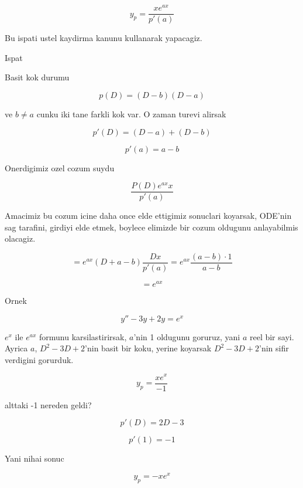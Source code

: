 \documentclass[12pt,fleqn]{article}\usepackage{../common}
\begin{document}
\[ y_p = \frac{x e^{ax}}{p'(a)} \]

Bu ispati ustel kaydirma kanunu kullanarak yapacagiz. 

Ispat

Basit kok durumu

\[ p(D) = (D-b)(D-a) \]

ve $b \ne a$ cunku iki tane farkli kok var. O zaman turevi alirsak

\[ p'(D) = (D-a) + (D-b) \]

\[ p'(a) = a-b \]

Onerdigimiz ozel cozum suydu

\[ \frac{P(D) e^{ax} x}{p'(a)} \]

Amacimiz bu cozum icine daha once elde ettigimiz sonuclari koyarsak,
ODE'nin sag tarafini, girdiyi elde etmek, boylece elimizde bir cozum
oldugunu anlayabilmis olacagiz. 

\[ = e^{ax}(D+a-b)\frac{Dx}{p'(a)} = e^{ax} \frac{(a-b) \cdot 1}{a-b} \]

\[ = e^{ax} \]

Ornek

\[ y'' - 3y + 2y = e^x \]

$e^x$ ile $e^{ax}$ formunu karsilastirirsak, $a$'nin 1 oldugunu goruruz,
yani $a$ reel bir sayi. Ayrica $a$, $D^2-3D+2$'nin basit bir koku, yerine
koyarsak $D^2-3D+2$'nin sifir verdigini gorurduk. 

\[ y_p = \frac{xe^x}{-1} \]

alttaki -1 nereden geldi? 

\[ p'(D) = 2D - 3 \]

\[ p'(1) = -1 \]

Yani nihai sonuc

\[ y_p = -xe^x \]
\end{document}

